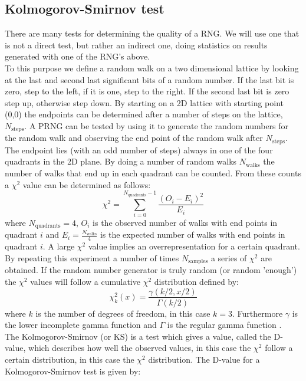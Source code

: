 \documentclass[10pt,a4paper]{article}
\begin{document}
\subsection{Kolmogorov-Smirnov test}
There are many tests for determining the quality of a RNG. We will use one that is not a direct test, but rather an indirect one, doing statistics on results generated with one of the RNG's above.\\
\noindent To this purpose we define a random walk on a two dimensional lattice by looking at the last and second last significant bits of a random number. If the last bit is zero, step to the left, if it is one, step to the right. If the second last bit is zero step up, otherwise step down. By starting on a 2D lattice with starting point (0,0) the endpoints can be determined after a number of steps on the lattice, $N_{\text{steps}}$. A PRNG can be tested by using it to generate the random numbers for the random walk and observing the end point of the random walk after $N_{\text{steps}}$. The endpoint lies (with an odd number of steps) always in one of the four quadrants in the 2D plane. By doing a number of random walks $N_{\text{walks}}$ the number of walks that end up in each quadrant can be counted. From these counts a $\chi^2$ value can be determined as follows:
\begin{equation}
\chi^2 = \sum_{i=0}^{N_{\text{quadrants}}-1} \frac{(O_{i} - E_{i})^2}{E_{i}}
\end{equation}
\noindent where $N_{\text{quadrants}} = 4$, $O_{i}$ is the observed number of walks with end points in quadrant $i$ and $E_{i} = \frac{N_{\text{walks}}}{4}$ is the expected number of walks with end points in quadrant $i$. A large $\chi^2$ value implies an overrepresentation for a certain quadrant.\\
\noindent By repeating this experiment a number of times $N_{\text{samples}}$ a series of $\chi^2$ are obtained. If the random number generator is truly random (or random 'enough') the $\chi^2$ values will follow a cumulative $\chi^2$ distribution defined by:
\begin{equation}
\label{eq:1}
\chi_{k}^{2}(x) = \frac{\gamma(k/2,x/2)}{\Gamma(k/2)}
\end{equation}
where $k$ is the number of degrees of freedom, in this case $k = 3$. Furthermore $\gamma$ is the lower incomplete gamma function and $\Gamma$ is the regular gamma function \cite{book}.\\
\noindent The Kolmogorov-Smirnov (or KS) is a test which gives a value, called the D-value, which describes how well the observed values, in this case the $\chi^2$ follow a certain distribution, in this case the $\chi^2$ distribution. The D-value for a Kolmogorov-Smirnov test is given by:
\end{document}
